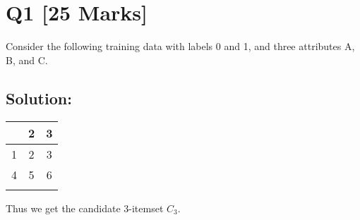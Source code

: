 \section*{Q1 [25 Marks]}

Consider the following training data with labels 0 and 1, and three attributes A, B, and C.


\subsection*{Solution:}

\begin{table}[h]
    \centering
    \begin{tabular}{ccc}
        \toprule
        \addlinespace[-0.5ex] %
        \toprule 
        1 & 2 & 3 \\
        \midrule
        1 & 2 & 3 \\
        \midrule
        4 & 5 & 6 \\
        \bottomrule
        \addlinespace[-0.2ex] %
        \bottomrule
    \end{tabular}
\end{table}

Thus we get the candidate  3-itemset $C_3$.